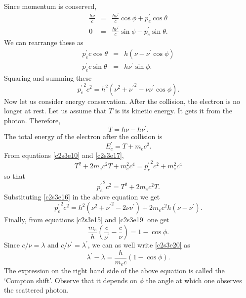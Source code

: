 Since momentum is conserved,
\begin{eqnarray}
\frac{h\nu}{c} &=& \frac{h\nu^\prime}{c}\cos\phi + p_e^\prime\cos\theta 
                   \label{c2s3e11} \\
0 &=& \frac{h\nu^\prime}{c}\sin\phi - p_e^\prime\sin\theta. \label{c2s3e12}
\end{eqnarray}
We can rearrange these as
\begin{eqnarray}
p_e^\prime c\cos\theta &=& h(\nu - \nu^\prime\cos\phi) \label{c2s3e13} \\
p_e^\prime c\sin\theta &=& h\nu^\prime\sin\phi. \label{c2s3e14}
\end{eqnarray}
Squaring and summing these
\begin{equation}\label{c2s3e15}
{p_e^\prime}^2c^2 = h^2(\nu^2 + {\nu^\prime}^2 - \nu\nu^\prime\cos\phi).
\end{equation}
Now let us consider energy conservation. After the collision, the electron
is no longer at rest. Let us assume that $T$ is its kinetic energy. It gets
it from the photon. Therefore,
\begin{equation}\label{c2s3e16}
T = h\nu - h\nu^\prime.
\end{equation}
The total energy of the electron after the collision is 
\begin{equation}\label{c2s3e17}
E_e^\prime =  T + m_ec^2.
\end{equation}
From equations \eqref{c2s3e10} and \eqref{c2s3e17},
\[
T^2 + 2m_ec^2T + m_e^2c^4 = {p_e^\prime}^2c^2 + m_e^2c^4
\]
so that
\begin{equation}\label{c2s3e18}
{p_e^\prime}^2c^2 = T^2 + 2m_ec^2T.
\end{equation}
Substituting \eqref{c2s3e16} in the above equation we get
\begin{equation}\label{c2s3e19}
{p_e^\prime}^2c^2 = h^2(\nu^2 + {\nu^\prime}^2 - 2\nu\nu^\prime) + 
                    2m_ec^2h(\nu - \nu^\prime).
\end{equation}
Finally, from equations \eqref{c2s3e15} and \eqref{c2s3e19} one get
\begin{equation}\label{c2s3e20}
\frac{m_e}{h}\left(\frac{c}{\nu^\prime} - \frac{c}{\nu}\right) = 1-\cos\phi.
\end{equation}
Since $c/\nu = \lambda$ and $c/\nu^\prime = \lambda^\prime$, we can as well
write \eqref{c2s3e20} as
\begin{equation}\label{c2s3e21}
\lambda^\prime - \lambda = \frac{h}{m_ec}(1 - \cos\phi).
\end{equation}
The expression on the right hand side of the above equation is called the
`Compton shift'. Observe that it depends on $\phi$ the angle at which one
observes the scattered photon.

